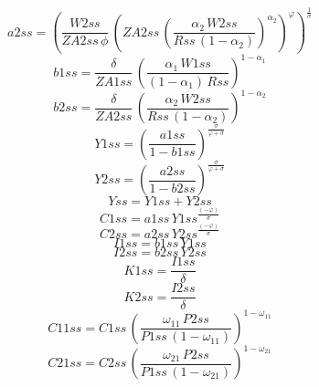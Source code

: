 \begin{dmath*}
a2ss = \left(\frac{{W2ss}}{{ZA2ss}\, {{\phi}}}\, \left({ZA2ss}\, \left(\frac{{{\alpha_{2}}}\, {W2ss}}{{Rss}\, \left(1-{{\alpha_{2}}}\right)}\right)^{{{\alpha_{2}}}}\right)^{{{\varphi}}}\right)^{\frac{1}{{{\sigma}}}}
\end{dmath*}
\begin{dmath*}
b1ss = \frac{{{\delta}}}{{ZA1ss}}\, \left(\frac{{{\alpha_{1}}}\, {W1ss}}{\left(1-{{\alpha_{1}}}\right)\, {Rss}}\right)^{1-{{\alpha_{1}}}}
\end{dmath*}
\begin{dmath*}
b2ss = \frac{{{\delta}}}{{ZA2ss}}\, \left(\frac{{{\alpha_{2}}}\, {W2ss}}{{Rss}\, \left(1-{{\alpha_{2}}}\right)}\right)^{1-{{\alpha_{2}}}}
\end{dmath*}
\begin{dmath*}
Y1ss = \left(\frac{{a1ss}}{1-{b1ss}}\right)^{\frac{{{\sigma}}}{{{\varphi}}+{{\sigma}}}}
\end{dmath*}
\begin{dmath*}
Y2ss = \left(\frac{{a2ss}}{1-{b2ss}}\right)^{\frac{{{\sigma}}}{{{\varphi}}+{{\sigma}}}}
\end{dmath*}
\begin{dmath*}
Yss = {Y1ss}+{Y2ss}
\end{dmath*}
\begin{dmath*}
C1ss = {a1ss}\, {Y1ss}^{\frac{\left(-{{\varphi}}\right)}{{{\sigma}}}}
\end{dmath*}
\begin{dmath*}
C2ss = {a2ss}\, {Y2ss}^{\frac{\left(-{{\varphi}}\right)}{{{\sigma}}}}
\end{dmath*}
\begin{dmath*}
I1ss = {b1ss}\, {Y1ss}
\end{dmath*}
\begin{dmath*}
I2ss = {b2ss}\, {Y2ss}
\end{dmath*}
\begin{dmath*}
K1ss = \frac{{I1ss}}{{{\delta}}}
\end{dmath*}
\begin{dmath*}
K2ss = \frac{{I2ss}}{{{\delta}}}
\end{dmath*}
\begin{dmath*}
C11ss = {C1ss}\, \left(\frac{{{\omega_{11}}}\, {P2ss}}{{P1ss}\, \left(1-{{\omega_{11}}}\right)}\right)^{1-{{\omega_{11}}}}
\end{dmath*}
\begin{dmath*}
C21ss = {C2ss}\, \left(\frac{{{\omega_{21}}}\, {P2ss}}{{P1ss}\, \left(1-{{\omega_{21}}}\right)}\right)^{1-{{\omega_{21}}}}
\end{dmath*}
